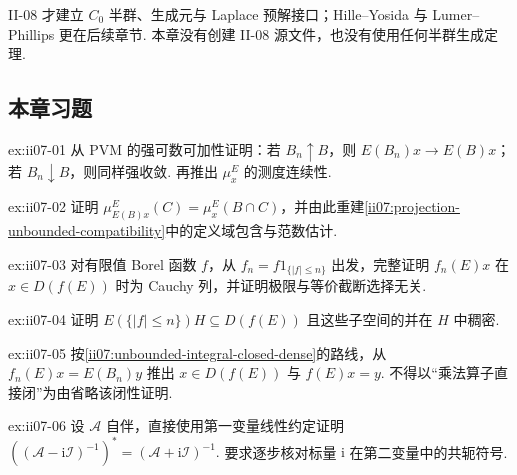 \begin{FARemark}[II-08 边界]
II-08 才建立 \(\displaystyle C_0\) 半群、生成元与 Laplace 预解接口；Hille--Yosida 与 Lumer--Phillips 更在后续章节. 本章没有创建 II-08 源文件，也没有使用任何半群生成定理.
\end{FARemark}

\subsection*{本章习题}\label{sec:ii07-exercises}

\begin{FAExercise}[投影值测度的强可数可加性与连续性]{ex:ii07-01}
从 PVM 的强可数可加性证明：若 \(\displaystyle B_n\uparrow B\)，则 \(\displaystyle E(B_n)x\to E(B)x\)；若 \(\displaystyle B_n\downarrow B\)，则同样强收敛. 再推出 \(\displaystyle\mu_x^E\) 的测度连续性.
\end{FAExercise}

\begin{FAExercise}[标量谱测度与投影局部化]{ex:ii07-02}
证明 \(\displaystyle\mu_{E(B)x}^E(C)=\mu_x^E(B\cap C)\)，并由此重建\autoref{ii07:projection-unbounded-compatibility}中的定义域包含与范数估计.
\end{FAExercise}

\begin{FAExercise}{ex:ii07-03}
对有限值 Borel 函数 \(\displaystyle f\)，从 \(\displaystyle f_n=f1_{\{|f|\leqslant n\}}\) 出发，完整证明 \(\displaystyle f_n(E)x\) 在 \(\displaystyle x\in D(f(E))\) 时为 Cauchy 列，并证明极限与等价截断选择无关.
\end{FAExercise}

\begin{FAExercise}[无界谱积分定义域稠密]{ex:ii07-04}
证明 \(\displaystyle E(\{|f|\leqslant n\})H\subseteq D(f(E))\) 且这些子空间的并在 \(\displaystyle H\) 中稠密.
\end{FAExercise}

\begin{FAExercise}[无界谱积分闭性]{ex:ii07-05}
按\autoref{ii07:unbounded-integral-closed-dense}的路线，从 \(\displaystyle f_n(E)x=E(B_n)y\) 推出 \(\displaystyle x\in D(f(E))\) 与 \(\displaystyle f(E)x=y\). 不得以“乘法算子直接闭”为由省略该闭性证明.
\end{FAExercise}

\begin{FAExercise}[预解伴随恒等式]{ex:ii07-06}
设 \(\displaystyle\mathcal A\) 自伴，直接使用第一变量线性约定证明
\(\displaystyle ((\mathcal A-\mathrm{i}\mathcal I)^{-1})^* =(\mathcal A+\mathrm{i}\mathcal I)^{-1}.\)
要求逐步核对标量 \(\displaystyle\mathrm{i}\) 在第二变量中的共轭符号.
\end{FAExercise}

